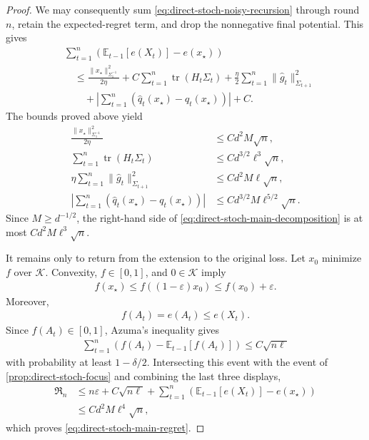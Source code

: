 \documentclass{article}
\theoremstyle{plain}
\theoremstyle{definition}
\theoremstyle{plain}
\newcommand{\tr}{\operatorname{tr}}
\newcommand{\Reg}{\mathfrak{R}}
\newcommand{\E}{\mathbb E}
\newcommand{\cK}{\mathcal K}
\begin{document}
\begin{proof}
    We may consequently sum
    \eqref{eq:direct-stoch-noisy-recursion} through round $n$, retain
    the expected-regret term, and drop the nonnegative final potential.
    This gives
    \begin{align}
         & \sum_{t=1}^n
        \left(\E_{t-1}[e(X_t)]-e(x_\star)\right)
        \nonumber       \\
         & \quad\leq
        \frac{\|x_\star\|_{\Sigma_1^{-1}}^2}{2\eta}
        +C\sum_{t=1}^n\tr(H_t\Sigma_t)
        +\frac\eta2\sum_{t=1}^n
        \|\widehat g_t\|_{\Sigma_{t+1}}^2
        \nonumber       \\
         & \qquad+
        \left|\sum_{t=1}^n
        (\widehat q_t(x_\star)-q_t(x_\star))
        \right|
        +C.
        \label{eq:direct-stoch-main-decomposition}
    \end{align}
    The bounds proved above yield
    \begin{align}
        \frac{\|x_\star\|_{\Sigma_1^{-1}}^2}{2\eta}
         & \leq C d^2M\sqrt n,
        \\
        \sum_{t=1}^n\tr(H_t\Sigma_t)
         & \leq C d^{3/2}\ell^3\sqrt n,
        \\
        \eta\sum_{t=1}^n
        \|\widehat g_t\|_{\Sigma_{t+1}}^2
         & \leq C d^2M\ell\sqrt n,
        \\
        \left|\sum_{t=1}^n
        (\widehat q_t(x_\star)-q_t(x_\star))
        \right|
         & \leq C d^{3/2}M\ell^{5/2}\sqrt n.
    \end{align}
    Since $M\geq d^{-1/2}$, the right-hand side of
    \eqref{eq:direct-stoch-main-decomposition} is at most
    $Cd^2M\ell^3\sqrt n$.

    It remains only to return from the extension to the original loss.
    Let $x_0$ minimize $f$ over $\cK$.  Convexity, $f\in[0,1]$, and
    $0\in\cK$ imply
    \begin{align}
        f(x_\star)
        \leq f((1-\varepsilon)x_0)
        \leq f(x_0)+\varepsilon.
        \label{eq:direct-stoch-shrink}
    \end{align}
    Moreover,
    \begin{align}
        f(A_t)=e(A_t)\leq e(X_t).
    \end{align}
    Since $f(A_t)\in[0,1]$, Azuma's inequality gives
    \begin{align}
        \sum_{t=1}^n
        \left(
        f(A_t)-\E_{t-1}[f(A_t)]
        \right)
        \leq C\sqrt{n\ell}
        \label{eq:direct-stoch-action-concentration}
    \end{align}
    with probability at least $1-\delta/2$.  Intersecting this event
    with the event of \cref{prop:direct-stoch-focus} and combining the
    last three displays,
    \begin{align}
        \Reg_n
         & \leq
        n\varepsilon+C\sqrt{n\ell}
        +\sum_{t=1}^n
        \left(\E_{t-1}[e(X_t)]-e(x_\star)\right)
        \\
         & \leq C d^2M\ell^4\sqrt n,
    \end{align}
    which proves \eqref{eq:direct-stoch-main-regret}.
\end{proof}
\end{document}
